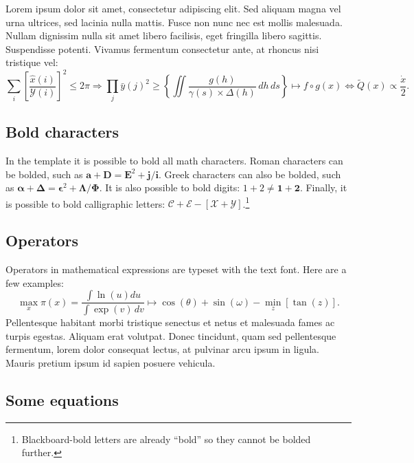 \documentclass[letterpaper,11pt,leqno]{article}
\begin{document}
Lorem ipsum dolor sit amet, consectetur adipiscing elit. Sed aliquam magna vel urna ultrices, sed lacinia nulla mattis. Fusce non nunc nec est mollis malesuada. Nullam dignissim nulla sit amet libero facilisis, eget fringilla libero sagittis. Suspendisse potenti. Vivamus fermentum consectetur ante, at rhoncus nisi tristique vel:
\begin{equation*}
\sum_i \left[\frac{\hat{x}(i)}{\mathcal{Y}(i)}\right]^2 \leq 2\pi \Rightarrow \prod_j \bar{y}(j)^2 \geq \left\{\iint \frac{g(h)}{\gamma(s) \times \Delta(h)}\,dh\,ds \right\} \mapsto f\circ g(x) \iff \tilde{Q}(x) \propto \frac{\dot{x}}{2}.
\end{equation*}

\subsection{Bold characters}

In the template it is possible to bold all math characters. Roman characters can be bolded, such as $\bm{a} + \bm{D} = \bm{E}^2 + \bm{j}/\bm{i}$. Greek characters can also be bolded, such as $\bm{\alpha} + \bm{\Delta} = \bm{\epsilon}^2 + \bm{\Lambda}/\bm{\Phi}$. It is also possible to bold digits: $1 + 2 \neq \bm{1} + \bm{2}$. Finally, it is possible to bold calligraphic letters: $\bm{\mathcal{C}} + \bm{\mathcal{E}} - [\bm{\mathcal{X}}+\bm{\mathcal{Y}}]$.\footnote{Blackboard-bold letters are already ``bold'' so they cannot be bolded further.}

\subsection{Operators} 

Operators in mathematical expressions are typeset with the text font. Here are a few examples: 
\begin{equation*}
\max_x \pi(x) = \frac{\int \ln(u)du}{\int\exp(v)\,dv} \mapsto \cos(\theta) + \sin(\omega) - \min_z[\tan(z)].
\end{equation*}
Pellentesque habitant morbi tristique senectus et netus et malesuada fames ac turpis egestas. Aliquam erat volutpat. Donec tincidunt, quam sed pellentesque fermentum, lorem dolor consequat lectus, at pulvinar arcu ipsum in ligula. Mauris pretium ipsum id sapien posuere vehicula. 

\subsection{Some equations} 
\end{document}
